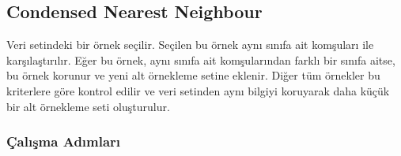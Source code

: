 \newpage

\subsection{Condensed Nearest Neighbour}
Veri setindeki bir örnek seçilir. Seçilen bu örnek aynı sınıfa ait komşuları ile karşılaştırılır. Eğer bu örnek, aynı sınıfa ait komşularından farklı bir sınıfa aitse, bu örnek korunur ve yeni alt örnekleme setine eklenir. Diğer tüm örnekler bu kriterlere göre kontrol edilir ve veri setinden aynı bilgiyi koruyarak daha küçük bir alt örnekleme seti oluşturulur.

\subsubsection{Çalışma Adımları}


